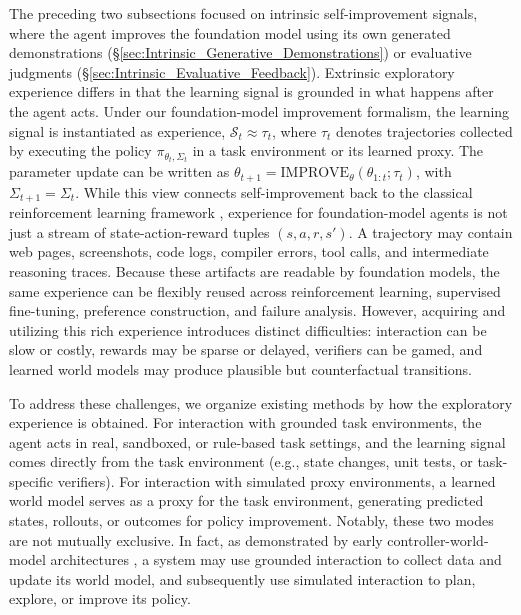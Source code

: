 The preceding two subsections focused on intrinsic self-improvement signals, where the agent improves the foundation model using its own generated demonstrations (\S \ref{sec:Intrinsic_Generative_Demonstrations}) or evaluative judgments (\S \ref{sec:Intrinsic_Evaluative_Feedback}). Extrinsic exploratory experience differs in that the learning signal is grounded in what happens after the agent acts. Under our foundation-model improvement formalism, the learning signal is instantiated as experience, $\mathcal{S}_t \approx \tau_t$, where $\tau_t$ denotes trajectories collected by executing the policy $\pi_{\theta_t, \Sigma_t}$ in a task environment or its learned proxy. The parameter update can be written as $\theta_{t+1} = \text{IMPROVE}_\theta(\theta_{1:t}; \tau_t)$, with $\Sigma_{t+1} = \Sigma_t$. While this view connects self-improvement back to the classical reinforcement learning framework \citep{silver2025welcome, zhao2024expel}, experience for foundation-model agents is not just a stream of state-action-reward tuples $(s,a,r,s')$. A trajectory may contain web pages, screenshots, code logs, compiler errors, tool calls, and intermediate reasoning traces. Because these artifacts are readable by foundation models, the same experience can be flexibly reused across reinforcement learning, supervised fine-tuning, preference construction, and failure analysis. However, acquiring and utilizing this rich experience introduces distinct difficulties: interaction can be slow or costly, rewards may be sparse or delayed, verifiers can be gamed, and learned world models \citep{schmidhuber1990making, schmidhuber2015learning,nanbo2025facts} may produce plausible but counterfactual transitions.

To address these challenges, we organize existing methods by how the exploratory experience is obtained. For interaction with grounded task environments, the agent acts in real, sandboxed, or rule-based task settings, and the learning signal comes directly from the task environment (e.g., state changes, unit tests, or task-specific verifiers). For interaction with simulated proxy environments, a learned world model serves as a proxy for the task environment, generating predicted states, rollouts, or outcomes for policy improvement. Notably, these two modes are not mutually exclusive. In fact, as demonstrated by early controller-world-model architectures \citep{schmidhuber1990making}, a system may use grounded interaction to collect data and update its world model, and subsequently use simulated interaction to plan, explore, or improve its policy.



